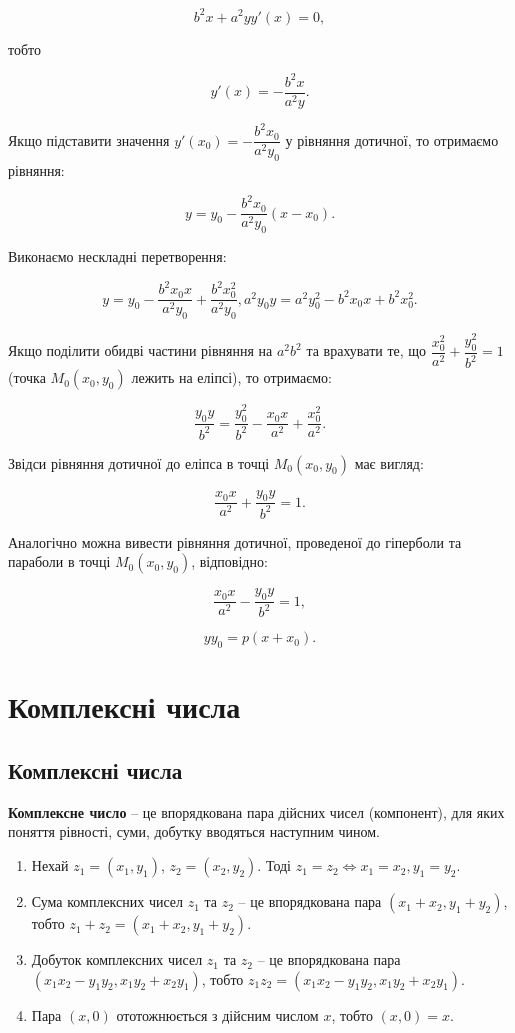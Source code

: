 $$b^2x + a^2yy'(x) = 0,$$

\begin{center}
тобто 
\end{center}

$$y'(x) = -\dfrac{b^2x}{a^2y}.$$

Якщо підставити значення $y'(x_0) = -\dfrac{b^2x_0}{a^2y_0}$
у рівняння дотичної, то отримаємо рівняння:

$$y = y_0 -\dfrac{b^2x_0}{a^2y_0}(x - x_0).$$

Виконаємо нескладні перетворення:

$$y = y_0 -\dfrac{b^2x_0x}{a^2y_0} +\dfrac{b^2x_0^2}{a^2y_0}, a^2y_0y = a^2y_0^2 - b^2x_0x + b^2x_0^2.$$

Якщо поділити обидві частини рівняння на $a^2b^2$ та врахувати те, що
$\dfrac{x_0^2}{a^2} + \dfrac{y_0^2}{b^2} = 1$ (точка $M_0(x_0,y_0)$ лежить на еліпсі), то отримаємо:

$$\dfrac{y_0y}{b^2} = \dfrac{y_0^2}{b^2} - \dfrac{x_0x}{a^2} + \dfrac{x_0^2}{a^2}.$$

Звідси рівняння дотичної до еліпса в точці $M_0(x_0,y_0)$ має вигляд:

$$\dfrac{x_0x}{a^2} + \dfrac{y_0y}{b^2} = 1.$$

Аналогічно можна вивести рівняння дотичної, проведеної до гіперболи та
параболи в точці $M_0(x_0,y_0)$, відповідно: 

$$\dfrac{x_0x}{a^2} - \dfrac{y_0y}{b^2} = 1,$$

$$yy_0 = p(x + x_0).$$

\section{Комплексні числа}


\subsection{Комплексні числа}

\begin{definition}
	\textbf{Комплексне число} -- це впорядкована пара дійсних чисел
	(компонент), для яких поняття рівності, суми, добутку вводяться наступним чином.
\end{definition}

\begin{enumerate}
	\item Нехай $z_1 = (x_1,y_1)$, $z_2 = (x_2,y_2)$. Тоді $z_1 = z_2 \Leftrightarrow x_1 = x_2, y_1 = y_2$.
	
	\item Сума комплексних чисел $z_1$ та $z_2$ -- це впорядкована пара $(x_1 + x_2,y_1 + y_2)$,
	тобто $z_1 + z_2 = (x_1 + x_2,y_1 + y_2)$.

	\item Добуток комплексних чисел $z_1$ та $z_2$ -- це впорядкована пара
	$(x_1x_2 - y_1y_2,x_1y_2 + x_2y_1)$, тобто $z_1z_2 = (x_1x_2 - y_1y_2,x_1y_2 + x_2y_1)$.

	\item Пара $(x,0)$ ототожнюється з дійсним числом $x$, тобто $(x,0) = x$.
\end{enumerate}

